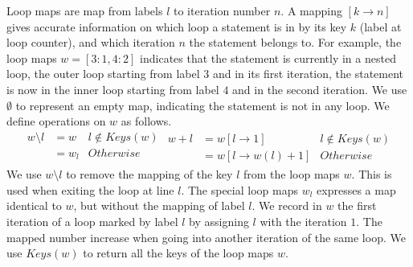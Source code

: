   Loop maps are map from labels $l$ to iteration number $n$.
  A  mapping $[k \to n]$ gives accurate information on which loop a statement is in by its key $k$ (label at loop counter), and which iteration $n$ the statement belongs to. For example, the loop maps $w=[3:1, 4:2]$ indicates that the statement is currently in a nested loop, the outer loop starting from label $3$ and in its first iteration, the statement is now in the inner loop starting from label $4$ and in the second iteration. We use $\emptyset$ to represent an empty map, indicating the statement is not in any loop. We define operations on $w$ as follows.
\[
\begin{array}{lll}
w \setminus l     & = w  & l \not\in Keys(w)   \\
     & = w_l & Otherwise \\
\end{array}
\begin{array}{llll}
   w + l & = w[l \to 1] & l \not \in Keys(w) \\   
     & = w [l \to w(l)+1] & Otherwise
\end{array}
\]
We use $w \setminus l$ to remove the mapping of the key $l$ from the loop maps $w$. This is used when exiting the loop at line $l$. The special loop maps $w_l$ expresses a map identical to $w$, but without the mapping of label $l$. We record in $w$ the first iteration of a loop marked by label $l$ by assigning $l$ with the iteration $1$. The mapped number increase when going into another iteration of the same loop. We use $Keys(w)$ to return all the keys of the loop maps $w$.


